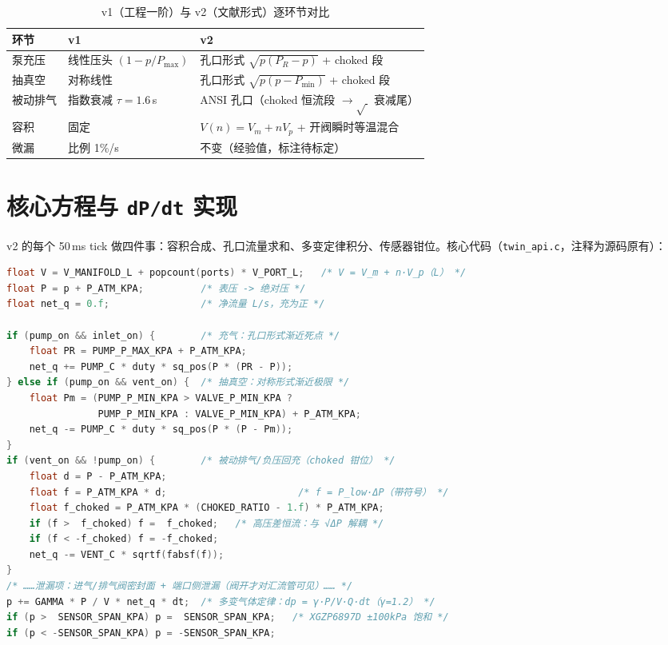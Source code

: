 \begin{table}[htbp]
  \centering
  \caption{v1（工程一阶）与 v2（文献形式）逐环节对比}
  \label{tab:twin-v1v2}
  \begin{tabular}{llp{4.2cm}}
    \toprule
    环节 & v1 & v2 \\
    \midrule
    泵充压 & 线性压头 $(1-p/P_\text{max})$ & 孔口形式 $\sqrt{p(P_R-p)}$ + choked 段 \\
    抽真空 & 对称线性 & 孔口形式 $\sqrt{p(p-P_\text{min})}$ + choked 段 \\
    被动排气 & 指数衰减 $\tau{=}1.6$\,s & ANSI 孔口（choked 恒流段 $\to\sqrt{\ }$ 衰减尾） \\
    容积 & 固定 & $V(n)=V_m+n V_p$ + 开阀瞬时等温混合 \\
    微漏 & 比例 1\%/s & 不变（经验值，标注待标定） \\
    \bottomrule
  \end{tabular}
\end{table}

\section{核心方程与 \texttt{dP/dt} 实现}
\label{sec:twin-dpdt}

v2 的每个 50\,ms tick 做四件事：容积合成、孔口流量求和、多变定律积分、传感器钳位。核心代码（\texttt{twin\_api.c}，注释为源码原有）：

\begin{lstlisting}[language=C, basicstyle=\small\ttfamily, breaklines=true,
  caption={twin\_api.c 物理积分核心：孔口流量、choked 钳位与多变定律（节选，泄漏项从略）}]
float V = V_MANIFOLD_L + popcount(ports) * V_PORT_L;   /* V = V_m + n·V_p（L） */
float P = p + P_ATM_KPA;          /* 表压 -> 绝对压 */
float net_q = 0.f;                /* 净流量 L/s，充为正 */

if (pump_on && inlet_on) {        /* 充气：孔口形式渐近死点 */
    float PR = PUMP_P_MAX_KPA + P_ATM_KPA;
    net_q += PUMP_C * duty * sq_pos(P * (PR - P));
} else if (pump_on && vent_on) {  /* 抽真空：对称形式渐近极限 */
    float Pm = (PUMP_P_MIN_KPA > VALVE_P_MIN_KPA ?
                PUMP_P_MIN_KPA : VALVE_P_MIN_KPA) + P_ATM_KPA;
    net_q -= PUMP_C * duty * sq_pos(P * (P - Pm));
}
if (vent_on && !pump_on) {        /* 被动排气/负压回充（choked 钳位） */
    float d = P - P_ATM_KPA;
    float f = P_ATM_KPA * d;                       /* f = P_low·ΔP（带符号） */
    float f_choked = P_ATM_KPA * (CHOKED_RATIO - 1.f) * P_ATM_KPA;
    if (f >  f_choked) f =  f_choked;   /* 高压差恒流：与 √ΔP 解耦 */
    if (f < -f_choked) f = -f_choked;
    net_q -= VENT_C * sqrtf(fabsf(f));
}
/* ……泄漏项：进气/排气阀密封面 + 端口侧泄漏（阀开才对汇流管可见）…… */
p += GAMMA * P / V * net_q * dt;  /* 多变气体定律：dp = γ·P/V·Q·dt（γ=1.2） */
if (p >  SENSOR_SPAN_KPA) p =  SENSOR_SPAN_KPA;   /* XGZP6897D ±100kPa 饱和 */
if (p < -SENSOR_SPAN_KPA) p = -SENSOR_SPAN_KPA;
\end{lstlisting}

